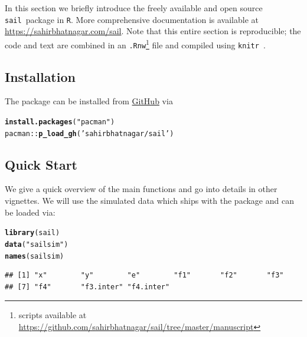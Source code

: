 \documentclass[12pt,letter]{article}\usepackage[]{graphicx}\usepackage[]{color}
\makeatletter
\newcommand{\hlstr}[1]{\textcolor[rgb]{0.192,0.494,0.8}{#1}}%
\newcommand{\hlopt}[1]{\textcolor[rgb]{0,0,0}{#1}}%
\newcommand{\hlstd}[1]{\textcolor[rgb]{0.345,0.345,0.345}{#1}}%
\newcommand{\hlkwd}[1]{\textcolor[rgb]{0.737,0.353,0.396}{\textbf{#1}}}%
\newenvironment{kframe}{%
 \def\at@end@of@kframe{}%
 \ifinner\ifhmode%
  \def\at@end@of@kframe{\end{minipage}}%
  \begin{minipage}{\columnwidth}%
 \fi\fi%
 \def\FrameCommand##1{\hskip\@totalleftmargin \hskip-\fboxsep
 \colorbox{shadecolor}{##1}\hskip-\fboxsep
     \hskip-\linewidth \hskip-\@totalleftmargin \hskip\columnwidth}%
 \MakeFramed {\advance\hsize-\width
   \@totalleftmargin\z@ \linewidth\hsize
   \@setminipage}}%
 {\par\unskip\endMakeFramed%
 \at@end@of@kframe}
\newenvironment{knitrout}{}{} %
\newcommand{\sail}{\texttt{sail}}
\makeatother
\begin{document}
In this section we briefly introduce the freely available and open source \sail ~package in \texttt{R}. More comprehensive documentation is available at \url{https://sahirbhatnagar.com/sail}. Note that this entire section is reproducible; the code and text are combined in an \texttt{.Rnw}\footnote[1]{scripts available at \url{https://github.com/sahirbhatnagar/sail/tree/master/manuscript}} file and compiled using \texttt{knitr}~\citep{xie2015dynamic}.

\subsection{Installation}

The package can be installed from \href{https://github.com/sahirbhatnagar/sail}{GitHub} via


\begin{knitrout}\scriptsize
{}\color{fgcolor}\begin{kframe}
\begin{alltt}
\hlkwd{install.packages}\hlstd{(}\hlstr{"pacman"}\hlstd{)}
\hlstd{pacman}\hlopt{::}\hlkwd{p_load_gh}\hlstd{(}\hlstr{'sahirbhatnagar/sail'}\hlstd{)}
\end{alltt}
\end{kframe}
\end{knitrout}



\subsection{Quick Start}

We give a quick overview of the main functions and go into details in other vignettes. We will use the simulated data which ships with the package and can be loaded via:

\begin{knitrout}\scriptsize
{}\color{fgcolor}\begin{kframe}
\begin{alltt}
\hlkwd{library}\hlstd{(sail)}
\hlkwd{data}\hlstd{(}\hlstr{"sailsim"}\hlstd{)}
\hlkwd{names}\hlstd{(sailsim)}
\end{alltt}
\begin{verbatim}
## [1] "x"        "y"        "e"        "f1"       "f2"       "f3"      
## [7] "f4"       "f3.inter" "f4.inter"
\end{verbatim}
\end{kframe}
\end{knitrout}
\end{document}
